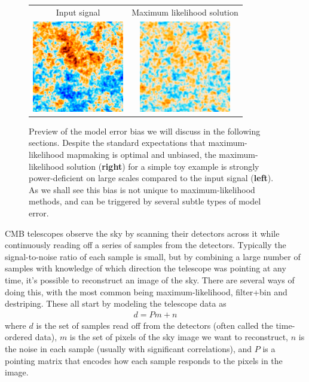 \documentclass[twocolumn,apj]{aastex63}
\newcommand{\dfn}[1]{\textbf{#1}}
\newenvironment{closetabcols}[1][0.5mm]{\setlength{\tabcolsep}{#1}}{}
\begin{document}
\begin{figure}
	\centering
	\begin{closetabcols}
	\begin{tabular}{cc}
		Input signal & Maximum likelihood solution \\
		\includegraphics[width=40mm]{subpix/toy2d_input_signal_map.png} &
		\includegraphics[width=40mm]{subpix/toy2d_ml_nn_signal_map.png} \\
	\end{tabular}
	\end{closetabcols}
	\caption{Preview of the model error bias we will discuss in the following
	sections. Despite the standard expectations that maximum-likelihood mapmaking
	is optimal and unbiased, the maximum-likelihood solution (\dfn{right})
	for a simple toy example is strongly power-deficient on large scales
	compared to the input signal (\dfn{left}). As we shall see this bias
	is not unique to maximum-likelihood methods, and can be triggered by
	several subtle types of model error.}
	\label{fig:maps-2d}
\end{figure}

CMB telescopes observe the sky by scanning their detectors across
it while continuously reading off a series of samples from the
detectors. Typically the signal-to-noise ratio of each sample is
small, but by combining a large number of samples with knowledge
of which direction the telescope was pointing at any time, it's
possible to reconstruct an image of the sky. There are several
ways of doing this, with the most common being maximum-likelihood,
filter+bin and destriping. These all start by modeling the
telescope data as \citep{tegmark-mapmaking}
\begin{align}
	d = Pm + n \label{eq:model}
\end{align}
where $d$ is the set of samples read off from the detectors
(often called the time-ordered data), $m$ is the set of pixels
of the sky image we want to reconstruct, $n$ is the noise
in each sample (usually with significant correlations), and
$P$ is a pointing matrix that encodes how each sample responds
to the pixels in the image.
\end{document}
